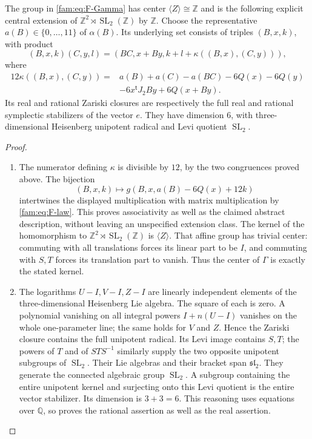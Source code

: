 \begin{proposition}\hypertarget{tag-01RA}{}\label{fam:src:F.1.2}\label{fam:st:F.1.2}

The group in \eqref{fam:eq:F-Gamma} has center
$\langle Z\rangle\cong\mathbb Z$ and is the following explicit central
extension of $\mathbb Z^2\rtimes\operatorname{SL}_2(\mathbb Z)$ by
$\mathbb Z$.  Choose the representative $a(B)\in\{0,\ldots,11\}$ of
$\alpha(B)$.  Its underlying set consists of triples $(B,x,k)$, with
product
\[
 (B,x,k)(C,y,l)=(BC,x+By,k+l+\kappa((B,x),(C,y))),
\]
where
\begin{align*}
12\kappa((B,x),(C,y))={}&a(B)+a(C)-a(BC)-6Q(x)-6Q(y)\\
 &-6x^{\mathsf t}J_2By+6Q(x+By).
\end{align*}
Its real and rational Zariski closures are respectively the full real
and rational symplectic stabilizers of the vector $e$.  They have
dimension $6$, with three-dimensional Heisenberg unipotent radical and
Levi quotient $\operatorname{SL}_2$.
\end{proposition}



\begin{proof}
\begin{enumerate}[label=\arabic*.,leftmargin=*]
\item The numerator defining $\kappa$ is divisible by $12$, by the two
congruences proved above.  The bijection
\[
 (B,x,k)\longmapsto g(B,x,a(B)-6Q(x)+12k)
\]
intertwines the displayed multiplication with matrix multiplication by
\eqref{fam:eq:F-law}.  This proves associativity as well as the claimed abstract
description, without leaving an unspecified extension class.  The kernel
of the homomorphism to $\mathbb Z^2\rtimes\operatorname{SL}_2(\mathbb Z)$
is $\langle Z\rangle$.  That affine group has trivial center: commuting
with all translations forces its linear part to be $I$, and commuting
with $S,T$ forces its translation part to vanish.  Thus the center of
$\Gamma$ is exactly the stated kernel.

\item The logarithms $U-I,V-I,Z-I$ are linearly independent elements of the
three-dimensional Heisenberg Lie algebra.  The square of each is zero.
A polynomial vanishing on all integral powers $I+n(U-I)$ vanishes on
the whole one-parameter line; the same holds for $V$ and $Z$.  Hence the
Zariski closure contains the full unipotent radical.  Its Levi image
contains $S,T$; the powers of $T$ and of $STS^{-1}$ similarly supply the
two opposite unipotent subgroups of $\operatorname{SL}_2$.  Their Lie
algebras and their bracket span $\mathfrak{sl}_2$.  They generate the
connected algebraic group $\operatorname{SL}_2$.  A subgroup containing
the entire unipotent kernel and surjecting onto this Levi quotient is
the entire vector stabilizer.  Its dimension is $3+3=6$.  This reasoning
uses equations over $\mathbb Q$, so proves the rational assertion as
well as the real assertion.
\end{enumerate}
\end{proof}

